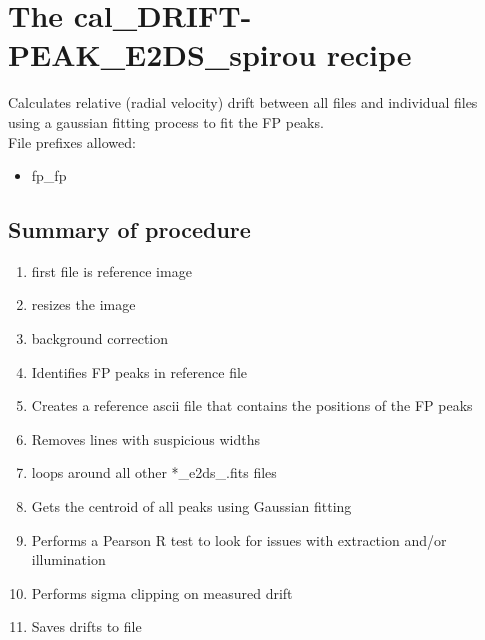 

\clearpage
\newpage
\section{The cal\_DRIFT-PEAK\_E2DS\_spirou recipe}
\label{section:cal_}

Calculates relative (radial velocity) drift between all files and individual files using a gaussian fitting process to fit the FP peaks. \\


\noindent File prefixes allowed:
\begin{itemize}
	\item fp\_fp
\end{itemize}

\subsection{Summary of procedure}
\begin{enumerate}
	\item first file is reference image
	\item resizes the image
	\item background correction
	\item Identifies FP peaks in reference file
	\item Creates a reference ascii file that contains the positions of the FP peaks
	\item Removes lines with suspicious widths
	\item loops around all other *\_e2ds\_.fits files
	\item Gets the centroid of all peaks using Gaussian fitting
	\item Performs a Pearson R test to look for issues with extraction and/or illumination
	\item Performs sigma clipping on measured drift
	\item Saves drifts to file
\end{enumerate}

